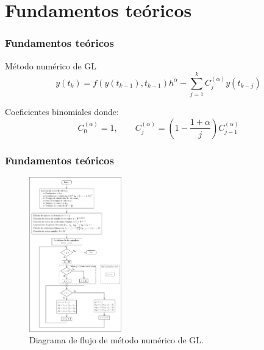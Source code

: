 \documentclass[10pt]{beamer}
\begin{document}
	\section{Fundamentos teóricos}
	\begin{frame}
		\frametitle{Fundamentos teóricos}
		\begin{block}{Método numérico de GL}
			\begin{equation}
		y(t_{k}) = f(y(t_{k-1}), t_{k-1}) h^{\alpha} - \sum_{j=1}^{k} C_{j}^{(\alpha)} y(t_{k-j})
		\label{ec:GL_numerico}
	\end{equation}
		\end{block}
		
		\begin{block}{Coeficientes binomiales}
		donde:
		\begin{equation}
		C_{0}^{(\alpha)} = 1, \qquad  C_{j}^{(\alpha)} = \left( 1 - \frac{1 + \alpha}{j} \right) C_{j-1}^{(\alpha)}
	\end{equation}
		\end{block}
	\end{frame}
	\begin{frame}
		\frametitle{Fundamentos teóricos}
		\begin{figure}[hbtp]
			\centering
			\includegraphics[width = 4cm]{diag_flug_GL.pdf}
			\caption{Diagrama de flujo de método numérico de GL.}
		\end{figure}
	\end{frame}	
\end{document}
